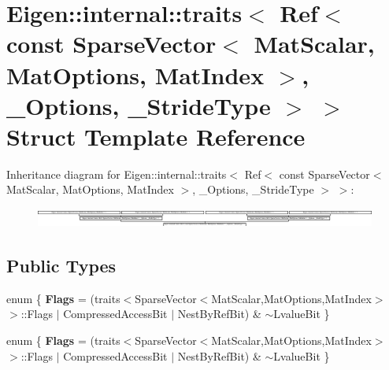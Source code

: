 \hypertarget{struct_eigen_1_1internal_1_1traits_3_01_ref_3_01const_01_sparse_vector_3_01_mat_scalar_00_01_mat15c4780d000a619e80140ca70456913a}{}\section{Eigen\+:\+:internal\+:\+:traits$<$ Ref$<$ const Sparse\+Vector$<$ Mat\+Scalar, Mat\+Options, Mat\+Index $>$, \+\_\+\+Options, \+\_\+\+Stride\+Type $>$ $>$ Struct Template Reference}
\label{struct_eigen_1_1internal_1_1traits_3_01_ref_3_01const_01_sparse_vector_3_01_mat_scalar_00_01_mat15c4780d000a619e80140ca70456913a}
Inheritance diagram for Eigen\+:\+:internal\+:\+:traits$<$ Ref$<$ const Sparse\+Vector$<$ Mat\+Scalar, Mat\+Options, Mat\+Index $>$, \+\_\+\+Options, \+\_\+\+Stride\+Type $>$ $>$\+:\begin{figure}[H]
\begin{center}
\leavevmode
\includegraphics[height=0.632530cm]{struct_eigen_1_1internal_1_1traits_3_01_ref_3_01const_01_sparse_vector_3_01_mat_scalar_00_01_mat15c4780d000a619e80140ca70456913a}
\end{center}
\end{figure}
\subsection*{Public Types}
\begin{DoxyCompactItemize}
\item 
\mbox{\label{struct_eigen_1_1internal_1_1traits_3_01_ref_3_01const_01_sparse_vector_3_01_mat_scalar_00_01_mat15c4780d000a619e80140ca70456913a_a2475aa1b12856a929b6ffa6e9332896e}} 
enum \{ {\bfseries Flags} = (traits$<$Sparse\+Vector$<$Mat\+Scalar,Mat\+Options,Mat\+Index$>$ $>$\+:\+:Flags $\vert$ Compressed\+Access\+Bit $\vert$ Nest\+By\+Ref\+Bit) \& $\sim$\+Lvalue\+Bit
 \}
\item 
\mbox{\label{struct_eigen_1_1internal_1_1traits_3_01_ref_3_01const_01_sparse_vector_3_01_mat_scalar_00_01_mat15c4780d000a619e80140ca70456913a_af1bf5eaa4b55a0b2c2117bf3954bf819}} 
enum \{ {\bfseries Flags} = (traits$<$Sparse\+Vector$<$Mat\+Scalar,Mat\+Options,Mat\+Index$>$ $>$\+:\+:Flags $\vert$ Compressed\+Access\+Bit $\vert$ Nest\+By\+Ref\+Bit) \& $\sim$\+Lvalue\+Bit
 \}
\end{DoxyCompactItemize}


